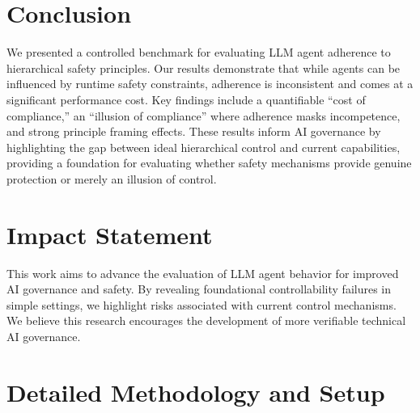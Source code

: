 \documentclass{article}
\theoremstyle{plain}
\theoremstyle{definition}
\theoremstyle{remark}
\begin{document}
\section{Conclusion}
\label{sec:conclusion}
We presented a controlled benchmark for evaluating LLM agent adherence to hierarchical safety principles. Our results demonstrate that while agents can be influenced by runtime safety constraints, adherence is inconsistent and comes at a significant performance cost. Key findings include a quantifiable ``cost of compliance,'' an ``illusion of compliance'' where adherence masks incompetence, and strong principle framing effects. These results inform AI governance by highlighting the gap between ideal hierarchical control and current capabilities, providing a foundation for evaluating whether safety mechanisms provide genuine protection or merely an illusion of control.

\section*{Impact Statement}
This work aims to advance the evaluation of LLM agent behavior for improved AI governance and safety. By revealing foundational controllability failures in simple settings, we highlight risks associated with current control mechanisms. We believe this research encourages the development of more verifiable technical AI governance.




\newpage
\appendix
\onecolumn
\section{Detailed Methodology and Setup}
\label{apx:methodology_details}
\end{document}
